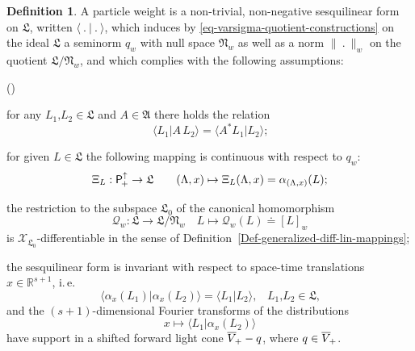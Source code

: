 \documentclass[11pt,twoside,openright]{report}
\theoremstyle{definition}
\newtheorem{Def}{Definition}[chapter]
\theoremstyle{plain}
\theoremstyle{remark}
\theoremstyle{assumption}
\newcommand{\norm}[1]{\lVert #1 \rVert}
\newcommand{\qw}{q_w}
\newcommand{\scp}[2]{\langle #1 \vert #2 \rangle}
\newcommand{\bscp}[2]{\bigl\langle #1 \big\vert #2 \bigr\rangle}
\newcommand{\Afrak}{\mathfrak{A}}
\newcommand{\Lfrak}{\mathfrak{L}}
\newcommand{\Nfrak}{\mathfrak{N}}
\newcommand{\Qscr}{\mathscr{Q}}
\newcommand{\Xscr}{\mathscr{X}}
\newcommand{\Rsone}{\mathbb{R}^{s + 1}}
\newcommand{\Poin}{\mathsf{P}_{\negthinspace +}^\uparrow}
\newcommand{\fwcone}{\overline{V}_{\negthinspace +}}
\newcommand{\aLax}{\alpha_{( \Lambda , x )}}
\newcommand{\ax}{\alpha_x}
\newcounter{propitem}
\newenvironment{proplist}{\begin{list}{(\roman{propitem})}%
  {\usecounter{propitem} \setlength{\topsep}{0ex}%
   \setlength{\parsep}{0.2ex} \setlength{\itemsep}{0.4ex}%
   \setlength{\leftmargin}{0em} \setlength{\itemindent}{0.5em}%
   }}{\end{list}}
\begin{document}
\begin{Def}
  \label{Def-particle-weight}
  A particle weight is a non-trivial, non-negative sesquilinear form
  on $\Lfrak$, written $\scp{~.~}{~.~}$, which induces by
  \eqref{eq-varsigma-quotient-constructions} on the ideal $\Lfrak$ a
  seminorm $q_w$ with null space $\Nfrak_w$ as well as a norm
  $\norm{~.~}_w$ on the quotient $\Lfrak / \Nfrak_w$, and which
  complies with the following assumptions:
  \begin{proplist}
  \item for any $L_1 \text{,} L_2 \in \Lfrak$ and $A \in \Afrak$ there
    holds the relation 
    \begin{equation*}
      \scp{L_1}{A \, L_2} = \scp{A^* L_1}{L_2} \text{;}
    \end{equation*}
  \item for given $L \in \Lfrak$ the following mapping is continuous
    with respect to $\qw$:
    \begin{equation*}
      \Xi_L : \Poin \rightarrow \Lfrak \qquad ( \Lambda , x ) \mapsto
      \Xi_L ( \Lambda , x ) = \aLax ( L ) \text{;}
    \end{equation*}
  \item the restriction to the subspace $\Lfrak_0$ of the canonical
    homomorphism
    \begin{equation*}
      \Qscr_w : \Lfrak \rightarrow \Lfrak / \Nfrak_w \quad L \mapsto
      \Qscr_w ( L ) \doteq [ L ]_w
    \end{equation*}
    is $\Xscr_{\Lfrak_0}$-differentiable in the sense of
    Definition~\ref{Def-generalized-diff-lin-mappings};
  \item the sesquilinear form is invariant with respect to space-time
    translations $x \in \Rsone$, i.\,e.
    \begin{equation*}
      \bscp{\ax ( L_1 )}{\ax ( L_2 )} = \scp{L_1}{L_2} \text{,} \quad
      L_1 \text{,} L_2 \in \Lfrak \text{,}
    \end{equation*}
    and the $(s + 1)$-dimensional Fourier transforms of the
    distributions
    \begin{equation*}
      x \mapsto \bscp{L_1}{\ax ( L_2 )}
    \end{equation*}
    have support in a shifted forward light cone $\fwcone - q$, where
    $q \in \fwcone$.
  \end{proplist}
\end{Def}
\end{document}
